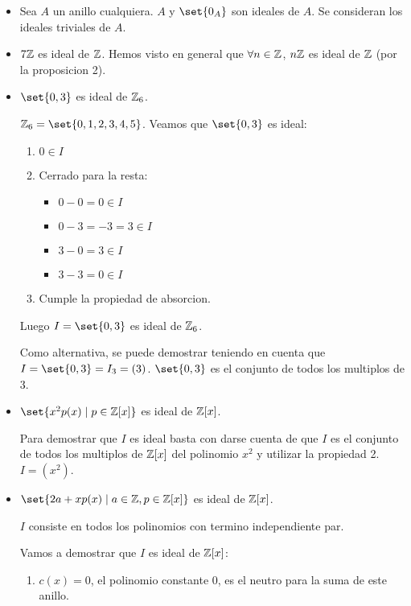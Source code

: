 \begin{example}
	\label{ejemploanillos}
	\begin{itemize}
		\item Sea \(A \) un anillo cualquiera. \(A \) y \(\set{0_A }\) son ideales de \(A \). Se consideran los ideales triviales de \(A \).
		\item \(7\mathbb{Z} \) es ideal de \(\mathbb{Z} \). Hemos visto en general que \(\forall n \in \mathbb{Z}\), \(n\mathbb{Z} \) es ideal de \(\mathbb{Z} \) (por la proposicion 2).
		\item \(\set{0,3 }\) es ideal de \(\mathbb{Z}_6 \).
		      
		      \(\Z_6 = \set{0,1,2,3,4,5}\). Veamos que \(\set{0,3}\) es ideal:
		      \begin{enumerate}
			      \item \(0 \in I \)
			      \item Cerrado para la resta: \begin{itemize}
				            \item \(0 - 0 = 0 \in I\)
				            \item \(0 - 3 = -3 = 3 \in I \)
				            \item \(3 - 0 = 3 \in I\)
				            \item \(3 - 3 = 0 \in I\)
			            \end{itemize}
			      \item Cumple la propiedad de absorcion.
		      \end{enumerate}
		      Luego \(I = \set{0,3}\) es ideal de \(\mathbb{Z}_6\).
		      
		      Como alternativa, se puede demostrar teniendo en cuenta que \(I = \set{0,3} = I_3 = (3 )\). \(\set{0,3 }\) es el conjunto de todos los multiplos de \(3 \).
		\item \(\set{x^{2}p(x) \mid p \in \Z[x] }\) es ideal de \(\mathbb{Z}[x ]\).
		      
		      Para demostrar que \(I \) es ideal basta con darse cuenta de que \(I \) es el conjunto de todos los multiplos de \(\mathbb{Z}[x ]\) del polinomio \(x^{2} \) y utilizar la propiedad 2. \(I = (x^{2 } )\).
		\item \(\set{2a + xp(x) \mid a \in \Z, p \in \Z[x ]}\) es ideal de \(\mathbb{Z}[x ]\).
		      
		      \(I \) consiste en todos los polinomios con termino independiente par.
		      
		      Vamos a demostrar que \(I \) es ideal de \(\mathbb{Z}[x ]\):
		      \begin{enumerate}
			      \item \(c(x) = 0\), el polinomio constante \(0 \), es el neutro para la suma de este anillo.
			            

\end{enumerate}
\end{itemize}
\end{example}
